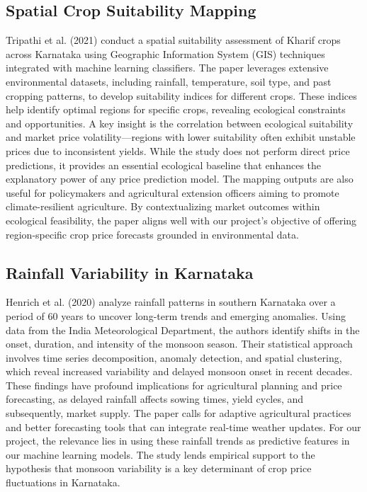 \subsection{Spatial Crop Suitability Mapping \cite{tripathi2021mapping}}
Tripathi et al. (2021) conduct a spatial suitability assessment of Kharif crops across Karnataka using Geographic Information System (GIS) techniques integrated with machine learning classifiers. The paper leverages extensive environmental datasets, including rainfall, temperature, soil type, and past cropping patterns, to develop suitability indices for different crops. These indices help identify optimal regions for specific crops, revealing ecological constraints and opportunities. A key insight is the correlation between ecological suitability and market price volatility—regions with lower suitability often exhibit unstable prices due to inconsistent yields. While the study does not perform direct price predictions, it provides an essential ecological baseline that enhances the explanatory power of any price prediction model. The mapping outputs are also useful for policymakers and agricultural extension officers aiming to promote climate-resilient agriculture. By contextualizing market outcomes within ecological feasibility, the paper aligns well with our project's objective of offering region-specific crop price forecasts grounded in environmental data.

\subsection{Rainfall Variability in Karnataka \cite{henrich2020rainfall}}
Henrich et al. (2020) analyze rainfall patterns in southern Karnataka over a period of 60 years to uncover long-term trends and emerging anomalies. Using data from the India Meteorological Department, the authors identify shifts in the onset, duration, and intensity of the monsoon season. Their statistical approach involves time series decomposition, anomaly detection, and spatial clustering, which reveal increased variability and delayed monsoon onset in recent decades. These findings have profound implications for agricultural planning and price forecasting, as delayed rainfall affects sowing times, yield cycles, and subsequently, market supply. The paper calls for adaptive agricultural practices and better forecasting tools that can integrate real-time weather updates. For our project, the relevance lies in using these rainfall trends as predictive features in our machine learning models. The study lends empirical support to the hypothesis that monsoon variability is a key determinant of crop price fluctuations in Karnataka.

